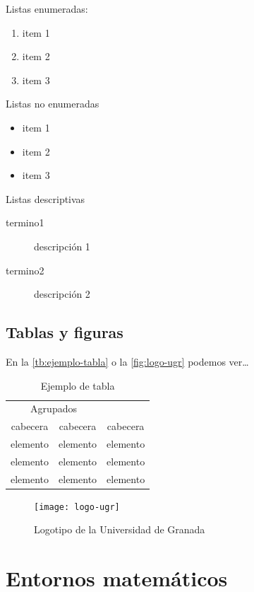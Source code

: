 Listas enumeradas:
\begin{enumerate}
  \item item 1
  \item item 2
  \item item 3
\end{enumerate}

Listas no enumeradas
\begin{itemize}
  \item item 1
  \item item 2
  \item item 3
  \end{itemize}

Listas descriptivas
\begin{description}
  \item[termino1] descripción 1
  \item[termino2] descripción 2
\end{description}
  
\subsection{Tablas y figuras}

En la \autoref{tb:ejemplo-tabla} o la \autoref{fig:logo-ugr} podemos ver\ldots

\begin{table}[htpb]
  \centering
  \begin{tabular}{ccc} \toprule
    \multicolumn{2}{c}{Agrupados} \\ \cmidrule(r){1-2}
    cabecera & cabecera & cabecera          \\ \midrule
    elemento & elemento & elemento          \\ 
    elemento & elemento & elemento          \\ 
    elemento & elemento & elemento          \\ \bottomrule
  \end{tabular}
  \caption{Ejemplo de tabla}
  \label{tb:ejemplo-tabla}
\end{table}

\begin{figure}[htpb]
  \centering
  \texttt{[image: logo-ugr]}
  \caption{Logotipo de la Universidad de Granada}
  \label{fig:logo-ugr}
\end{figure}

\section{Entornos matemáticos}

